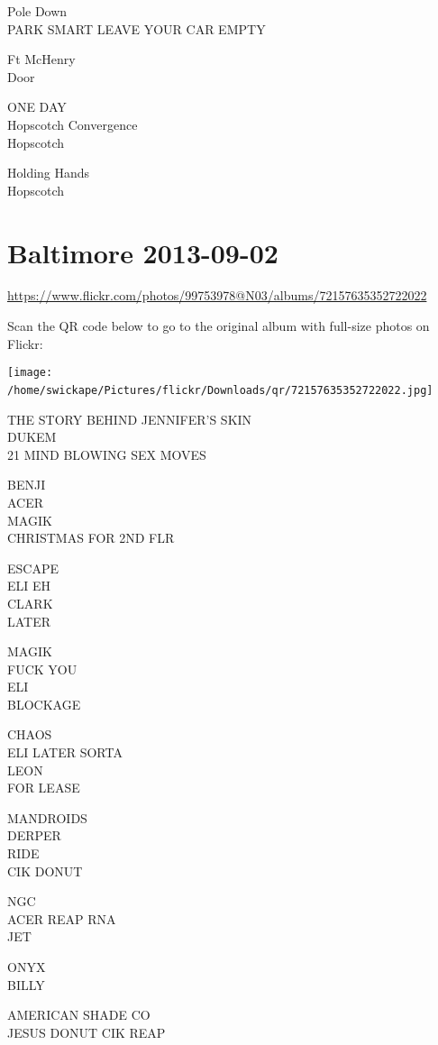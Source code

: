 \documentclass[10pt,letterpaper]{article}
\begin{document}
Pole Down\\
PARK SMART LEAVE YOUR CAR EMPTY

Ft McHenry\\
Door

ONE DAY\\
Hopscotch Convergence\\
Hopscotch

Holding Hands\\
Hopscotch
\

\section*{Baltimore 2013-09-02}

\url{https://www.flickr.com/photos/99753978@N03/albums/72157635352722022}

Scan the QR code below to go to the original album with full-size photos on Flickr:

\texttt{[image: /home/swickape/Pictures/flickr/Downloads/qr/72157635352722022.jpg]}
\

THE STORY BEHIND JENNIFER'S SKIN\\
DUKEM\\
21 MIND BLOWING SEX MOVES

BENJI\\
ACER\\
MAGIK\\
CHRISTMAS FOR 2ND FLR

ESCAPE\\
ELI EH\\
CLARK\\
LATER

MAGIK\\
FUCK YOU\\
ELI\\
BLOCKAGE

CHAOS\\
ELI LATER SORTA\\
LEON\\
FOR LEASE

MANDROIDS\\
DERPER\\
RIDE\\
CIK DONUT

NGC\\
ACER REAP RNA\\
JET

ONYX\\
BILLY

AMERICAN SHADE CO\\
JESUS DONUT CIK REAP
\end{document}
